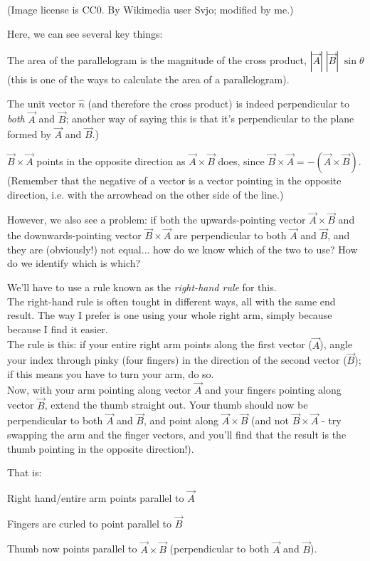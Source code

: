 \documentclass[12pt,a4paper]{report}
\newenvironment{itemize*}
  {\begin{itemize}
    \setlength{\itemsep}{0pt}
    \setlength{\parskip}{0pt}}
  {\end{itemize}}
\begin{document}
(Image license is CC0. By Wikimedia user Svjo; modified by me.)

Here, we can see several key things:
\begin{itemize*}
\item The area of the parallelogram is the magnitude of the cross product, $|\vec{A}| \; |\vec{B}| \; \sin{\theta}$ (this is one of the ways to calculate the area of a parallelogram).
\item The unit vector $\hat{n}$ (and therefore the cross product) is indeed perpendicular to \emph{both} $\vec{A}$ and $\vec{B}$; another way of saying this is that it's perpendicular to the plane formed by $\vec{A}$ and $\vec{B}$.)
\item $\vec{B} \times \vec{A}$ points in the opposite direction as $\vec{A} \times \vec{B}$ does, since $\vec{B} \times \vec{A} = -(\vec{A} \times \vec{B})$. (Remember that the negative of a vector is a vector pointing in the opposite direction, i.e. with the arrowhead on the other side of the line.)
\end{itemize*}

However, we also see a problem: if both the upwards-pointing vector $\vec{A} \times \vec{B}$ and the downwards-pointing vector $\vec{B} \times \vec{A}$ are perpendicular to both $\vec{A}$ and $\vec{B}$, and they are (obviously!) not equal... how do we know which of the two to use? How do we identify which is which?

We'll have to use a rule known as the \emph{right-hand rule} for this.\\
The right-hand rule is often tought in different ways, all with the same end result. The way I prefer is one using your whole right arm, simply because because I find it easier.\\
The rule is this: if your entire right arm points along the first vector ($\vec{A}$), angle your index through pinky (four fingers) in the direction of the second vector ($\vec{B}$); if this means you have to turn your arm, do so.\\
Now, with your arm pointing along vector $\vec{A}$ and your fingers pointing along vector $\vec{B}$, extend the thumb straight out. Your thumb should now be perpendicular to both $\vec{A}$ and $\vec{B}$, and point along $\vec{A} \times \vec{B}$ (and not $\vec{B} \times \vec{A}$ - try swapping the arm and the finger vectors, and you'll find that the result is the thumb pointing in the opposite direction!).

That is:

\begin{itemize*}
\item Right hand/entire arm points parallel to $\vec{A}$
\item Fingers are curled to point parallel to $\vec{B}$
\item Thumb now points parallel to $\vec{A} \times \vec{B}$ (perpendicular to both $\vec{A}$ and $\vec{B}$).
\end{itemize*}
\end{document}
